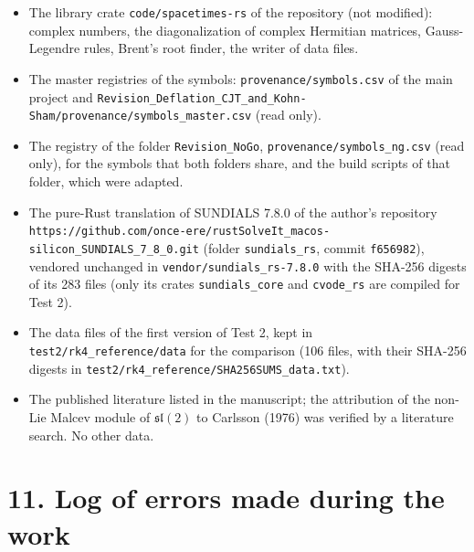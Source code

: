 \documentclass[
  10pt,
]{article}
\providecommand{\tightlist}{%
  \setlength{\itemsep}{0pt}\setlength{\parskip}{0pt}}
\begin{document}
\begin{itemize}
\tightlist
\item
  The library crate \texttt{code/spacetimes-rs} of the repository (not
  modified): complex numbers, the diagonalization of complex Hermitian
  matrices, Gauss-Legendre rules, Brent's root finder, the writer of
  data files.
\item
  The master registries of the symbols: \texttt{provenance/symbols.csv}
  of the main project and
  \texttt{Revision\_Deflation\_CJT\_and\_Kohn-Sham/provenance/symbols\_master.csv}
  (read only).
\item
  The registry of the folder \texttt{Revision\_NoGo},
  \texttt{provenance/symbols\_ng.csv} (read only), for the symbols that
  both folders share, and the build scripts of that folder, which were
  adapted.
\item
  The pure-Rust translation of SUNDIALS 7.8.0 of the author's repository
  \texttt{https://github.com/once-ere/rustSolveIt\_macos-silicon\_SUNDIALS\_7\_8\_0.git}
  (folder \texttt{sundials\_rs}, commit \texttt{f656982}), vendored
  unchanged in \texttt{vendor/sundials\_rs-7.8.0} with the SHA-256
  digests of its 283 files (only its crates \texttt{sundials\_core} and
  \texttt{cvode\_rs} are compiled for Test 2).
\item
  The data files of the first version of Test 2, kept in
  \texttt{test2/rk4\_reference/data} for the comparison (106 files, with
  their SHA-256 digests in
  \texttt{test2/rk4\_reference/SHA256SUMS\_data.txt}).
\item
  The published literature listed in the manuscript; the attribution of
  the non-Lie Malcev module of \(\mathfrak{sl}(2)\) to Carlsson (1976)
  was verified by a literature search. No other data.
\end{itemize}

\hypertarget{log-of-errors-made-during-the-work}{%
\section{11. Log of errors made during the
work}\label{log-of-errors-made-during-the-work}}
\end{document}
